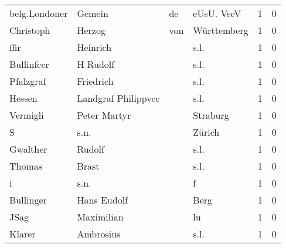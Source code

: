 \begin{tabular}{llllrr}
            belg.Londoner &                             Gemein &          de &                                  eUsU. VseV &          1 &         0 \\
                Christoph &                             Herzog &         von &                                 Württemberg &          1 &         0 \\
                     ffir &                           Heinrich &             &                                        s.l. &          1 &         0 \\
               Bullinfcer &                           H Rudolf &             &                                        s.l. &          1 &         0 \\
                Pfalzgraf &                          Friedrich &             &                                        s.l. &          1 &         0 \\
                   Hessen &                Landgraf Philippvcc &             &                                        s.l. &          1 &         0 \\
                 Vermigli &                       Peter Martyr &             &                                    Straburg &          1 &         0 \\
                        S &                               s.n. &             &                                      Zürich &          1 &         0 \\
                 Gwalther &                             Rudolf &             &                                        s.l. &          1 &         0 \\
                   Thomas &                              Brast &             &                                        s.l. &          1 &         0 \\
                        i &                               s.n. &             &                                           f &          1 &         0 \\
                Bullinger &                        Hans Eudolf &             &                                        Berg &          1 &         0 \\
                     JSag &                         Maximilian &             &                                          lu &          1 &         0 \\
                   Klarer &                          Ambrosius &             &                                        s.l. &          1 &         0 \\

\end{tabular}
